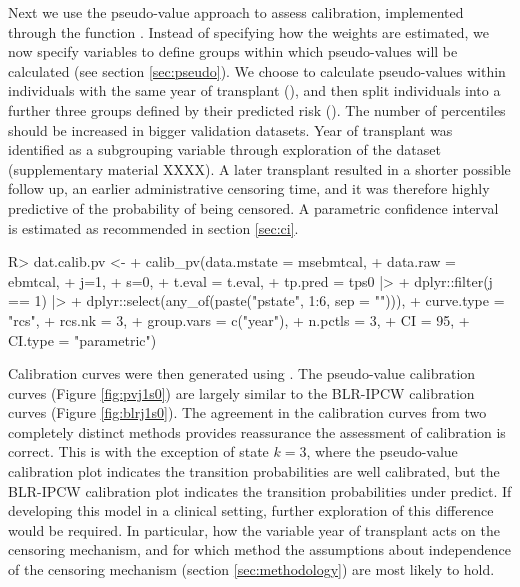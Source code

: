 \documentclass[article,shortnames]{jss}
\begin{document}
Next we use the pseudo-value approach to assess calibration, implemented through the function . Instead of specifying how the weights are estimated, we now specify variables to define groups within which pseudo-values will be calculated (see section \ref{sec:pseudo}). We choose to calculate pseudo-values within individuals with the same year of transplant (), and then split individuals into a further three groups defined by their predicted risk (). The number of percentiles should be increased in bigger validation datasets. Year of transplant was identified as a subgrouping variable through exploration of the dataset (supplementary material XXXX). A later transplant resulted in a shorter possible follow up, an earlier administrative censoring time, and it was therefore highly predictive of the probability of being censored. A parametric confidence interval is estimated as recommended in section \ref{sec:ci}.

\begin{Schunk}
\begin{Sinput}
R> dat.calib.pv <-
+    calib_pv(data.mstate = msebmtcal,
+                  data.raw = ebmtcal,
+                  j=1,
+                  s=0,
+                  t.eval = t.eval,
+                  tp.pred = tps0 |>
+                   dplyr::filter(j == 1) |>
+                   dplyr::select(any_of(paste("pstate", 1:6, sep = ""))),
+                  curve.type = "rcs",
+                  rcs.nk = 3,
+                  group.vars = c("year"),
+                  n.pctls = 3,
+                  CI = 95,
+                  CI.type = "parametric")
\end{Sinput}
\end{Schunk}

Calibration curves were then generated using . The pseudo-value calibration curves (Figure \ref{fig:pvj1s0}) are largely similar to the BLR-IPCW calibration curves (Figure \ref{fig:blrj1s0}). The agreement in the calibration curves from two completely distinct methods provides reassurance the assessment of calibration is correct. This is with the exception of state $k = 3$, where the pseudo-value calibration plot indicates the transition probabilities are well calibrated, but the BLR-IPCW calibration plot indicates the transition probabilities under predict. If developing this model in a clinical setting, further exploration of this difference would be required. In particular, how the variable year of transplant acts on the censoring mechanism, and for which method the assumptions about independence of the censoring mechanism (section \ref{sec:methodology}) are most likely to hold.
\end{document}
